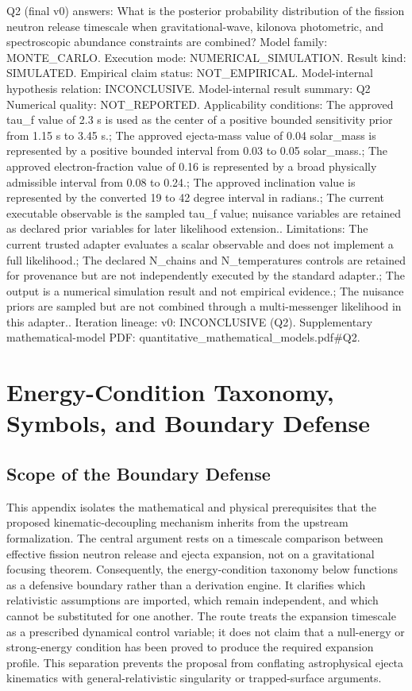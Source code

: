 \documentclass[conference]{IEEEtran}
\begin{document}
Q2 (final v0) answers: What is the posterior probability distribution of the fission neutron release timescale when gravitational-wave, kilonova photometric, and spectroscopic abundance constraints are combined? Model family: MONTE\_CARLO. Execution mode: NUMERICAL\_SIMULATION. Result kind: SIMULATED. Empirical claim status: NOT\_EMPIRICAL. Model-internal hypothesis relation: INCONCLUSIVE. Model-internal result summary: Q2 Numerical quality: NOT\_REPORTED. Applicability conditions: The approved tau\_f value of 2.3 s is used as the center of a positive bounded sensitivity prior from 1.15 s to 3.45 s.; The approved ejecta-mass value of 0.04 solar\_mass is represented by a positive bounded interval from 0.03 to 0.05 solar\_mass.; The approved electron-fraction value of 0.16 is represented by a broad physically admissible interval from 0.08 to 0.24.; The approved inclination value is represented by the converted 19 to 42 degree interval in radians.; The current executable observable is the sampled tau\_f value; nuisance variables are retained as declared prior variables for later likelihood extension.. Limitations: The current trusted adapter evaluates a scalar observable and does not implement a full likelihood.; The declared N\_chains and N\_temperatures controls are retained for provenance but are not independently executed by the standard adapter.; The output is a numerical simulation result and not empirical evidence.; The nuisance priors are sampled but are not combined through a multi-messenger likelihood in this adapter.. Iteration lineage: v0: INCONCLUSIVE (Q2). Supplementary mathematical-model PDF: quantitative\_mathematical\_models.pdf\#Q2.

\appendices
\section{Energy-Condition Taxonomy, Symbols, and Boundary Defense}
\subsection{Scope of the Boundary Defense}
This appendix isolates the mathematical and physical prerequisites that the proposed kinematic-decoupling mechanism inherits from the upstream formalization. The central argument rests on a timescale comparison between effective fission neutron release and ejecta expansion, not on a gravitational focusing theorem. Consequently, the energy-condition taxonomy below functions as a defensive boundary rather than a derivation engine. It clarifies which relativistic assumptions are imported, which remain independent, and which cannot be substituted for one another. The route treats the expansion timescale as a prescribed dynamical control variable; it does not claim that a null-energy or strong-energy condition has been proved to produce the required expansion profile. This separation prevents the proposal from conflating astrophysical ejecta kinematics with general-relativistic singularity or trapped-surface arguments.
\end{document}
